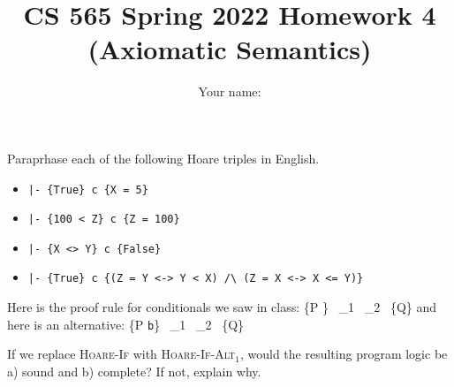 \documentclass[12pt]{article}
\newenvironment{problem}[2][Problem]{\begin{trivlist}
\item[\hskip \labelsep {\bfseries #1}\hskip \labelsep {\bfseries #2.}]}{\end{trivlist}}
\begin{document}
\title{CS 565 Spring 2022 Homework 4 (Axiomatic Semantics)}
\author{Your name: \underline{\hspace{10cm}}}
\maketitle

\begin{problem}{1 (2 points)}
Paraprhase each of the following Hoare triples in English.

\begin{itemize}
\item[a. ]   \lstinline!|- {True} c {X = 5}!
  \vspace{3cm}

\item[b. ]   \lstinline!|- {100 < Z} c {Z = 100}!
\vspace{3cm}

\item[c. ]   \lstinline!|- {X <> Y} c {False}!
\vspace{3cm}

\item[d. ]   \lstinline!|- {True} c {(Z = Y <-> Y < X) /\ (Z = X <-> X <= Y)}!
  \vspace{3cm}

\end{itemize}
\end{problem}

\pagebreak

\begin{problem}{2 (1 point)}
  Here is the proof rule for conditionals we saw in class:
  {\vdash \{P \}~ _1~ _2  ~\{Q\}}
  \noindent and here is an alternative:
  {\vdash \{P \land \lstinline|b|\}~ _1~ _2  ~\{Q\}}

  If we replace \textsc{Hoare-If} with \textsc{Hoare-If-Alt$_1$},
  would the resulting program logic be a) sound and b) complete?
  If not,  explain why.
  \end{problem}
  \vspace{6cm}
\end{document}
